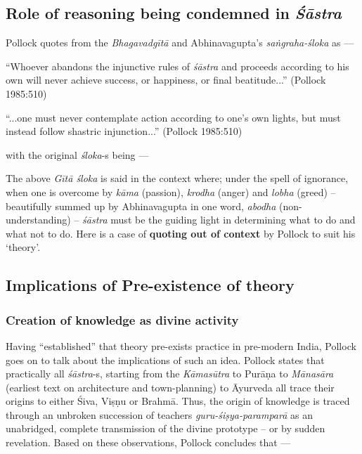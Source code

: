 \subsection{Role of reasoning being condemned in {{\sl\bfseries Śāstra}\relax}}\label{art12-sec3.7}

Pollock quotes from the {\sl Bhagavadgītā} and Abhinavagupta's {\sl saṅ\-graha-śloka} as ---
\begin{myquote}
``Whoever abandons the injunctive rules of {\sl śāstra} and proceeds according to his own will never achieve success, or happiness, or ﬁnal beatitude...” (Pollock 1985:510)

``...one must never contemplate action according to one's own lights, but must instead follow shastric injunction...'' (Pollock 1985:510)
\end{myquote}
with the original {\sl śloka}-s being ---

The above {\sl Gītā śloka} is said in the context where; under the spell of ignorance, when one is overcome by {\sl kāma} (passion), {\sl krodha} (anger) and {\sl lobha} (greed) -- beautifully summed up by Abhinavagupta in one word, {\sl abodha} (non-understanding) -- {\sl śāstra} must be the guiding light in determining what to do and what not to do. Here is a case of {\bf quoting out of context} by Pollock to suit his `theory'.

\subsection{Implications of Pre-existence of theory}\label{art12-sec3.8}

\subsubsection{Creation of knowledge as divine activity}\label{art12-sec3.8.1}

Having ``established'' that theory pre-exists practice in pre-modern India, Pollock goes on to talk about the implications of such an idea. Pollock states that practically all {\sl śāstra}-s, starting from the {\sl Kāmasūtra} to Purāṇa to {\sl Mānasāra} (earliest text on architecture and town-planning) to Āyurveda all trace their origins to either Śiva, Viṣṇu or Brahmā. Thus, the origin of knowledge is traced through an unbroken succession of teachers {\sl guru-śiṣya-paramparā} as an unabridged, complete transmission of the divine prototype -- or by sudden revelation. Based on these observations, Pollock concludes that ---

